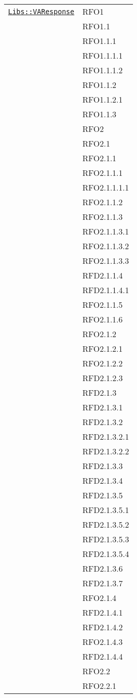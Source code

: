 \begin{longtable}{|>{\centering}m{10cm}|m{3cm}<{\centering}|}
\hyperref[Libs::VAResponse]{\texttt{Libs::VAResponse}} & RFO1\\
& RFO1.1\\
& RFO1.1.1\\
& RFO1.1.1.1\\
& RFO1.1.1.2\\
& RFO1.1.2\\
& RFO1.1.2.1\\
& RFO1.1.3\\
& RFO2\\
& RFO2.1\\
& RFO2.1.1\\
& RFO2.1.1.1\\
& RFO2.1.1.1.1\\
& RFO2.1.1.2\\
& RFO2.1.1.3\\
& RFO2.1.1.3.1\\
& RFO2.1.1.3.2\\
& RFO2.1.1.3.3\\
& RFD2.1.1.4\\
& RFD2.1.1.4.1\\
& RFO2.1.1.5\\
& RFO2.1.1.6\\
& RFO2.1.2\\
& RFO2.1.2.1\\
& RFO2.1.2.2\\
& RFD2.1.2.3\\
& RFD2.1.3\\
& RFD2.1.3.1\\
& RFD2.1.3.2\\
& RFD2.1.3.2.1\\
& RFD2.1.3.2.2\\
& RFD2.1.3.3\\
& RFD2.1.3.4\\
& RFD2.1.3.5\\
& RFD2.1.3.5.1\\
& RFD2.1.3.5.2\\
& RFD2.1.3.5.3\\
& RFD2.1.3.5.4\\
& RFD2.1.3.6\\
& RFD2.1.3.7\\
& RFO2.1.4\\
& RFD2.1.4.1\\
& RFD2.1.4.2\\
& RFO2.1.4.3\\
& RFD2.1.4.4\\
& RFO2.2\\
& RFO2.2.1\\

\end{longtable}
